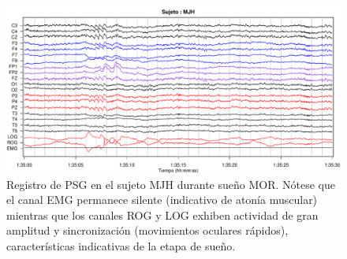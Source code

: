 \documentclass[12pt,a4paper]{mitthesis}
\begin{document}
\begin{figure}
\centering
\includegraphics[width=\linewidth]
{./p_170427/MJH_190_PDG_lucirse_PSG.pdf}
\caption{Registro de PSG en el sujeto MJH durante sue\~no MOR. N\'otese que el canal EMG permanece 
silente (indicativo de aton\'ia muscular) mientras que los canales ROG y LOG exhiben actividad de 
gran amplitud y sincronizaci\'on (movimientos oculares r\'apidos), caracter\'isticas indicativas de
la etapa de sue\~no.}
\label{ejemplos_mor}
\end{figure}


\end{document}
